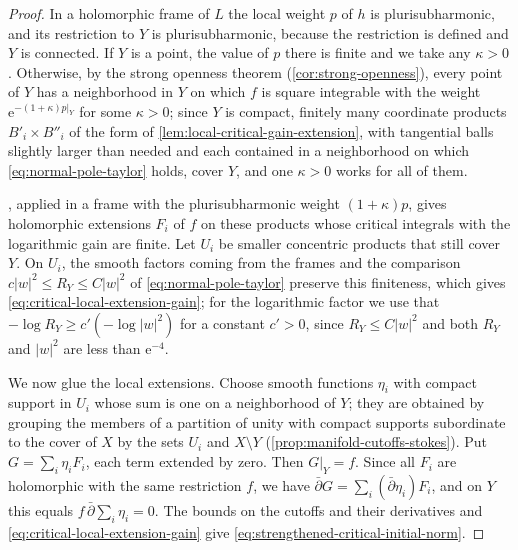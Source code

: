 \begin{proof}
In a holomorphic frame of $L$ the local weight $p$ of $h$ is plurisubharmonic, and its restriction to $Y$ is plurisubharmonic, because the restriction is defined and $Y$ is connected. If $Y$ is a point, the value of $p$ there is finite and we take any $\kappa>0$. Otherwise, by the strong openness theorem (\cref{cor:strong-openness}), every point of $Y$ has a neighborhood in $Y$ on which $f$ is square integrable with the weight $\mathrm e^{-(1+\kappa)p|_Y}$ for some $\kappa>0$; since $Y$ is compact, finitely many coordinate products $B'_i\times B''_i$ of the form of \cref{lem:local-critical-gain-extension}, with tangential balls slightly larger than needed and each contained in a neighborhood on which \eqref{eq:normal-pole-taylor} holds, cover $Y$, and one $\kappa>0$ works for all of them.

, applied in a frame with the plurisubharmonic weight $(1+\kappa)p$, gives holomorphic extensions $F_i$ of $f$ on these products whose critical integrals with the logarithmic gain are finite. Let $U_i$ be smaller concentric products that still cover $Y$. On $U_i$, the smooth factors coming from the frames and the comparison $c|w|^2\leq R_Y\leq C|w|^2$ of \eqref{eq:normal-pole-taylor} preserve this finiteness, which gives \eqref{eq:critical-local-extension-gain}; for the logarithmic factor we use that $-\log R_Y\geq c'(-\log|w|^2)$ for a constant $c'>0$, since $R_Y\leq C|w|^2$ and both $R_Y$ and $|w|^2$ are less than $\mathrm e^{-4}$.

We now glue the local extensions. Choose smooth functions $\eta_i$ with compact support in $U_i$ whose sum is one on a neighborhood of $Y$; they are obtained by grouping the members of a partition of unity with compact supports subordinate to the cover of $X$ by the sets $U_i$ and $X\setminus Y$ (\cref{prop:manifold-cutoffs-stokes}). Put $G=\sum_i\eta_iF_i$, each term extended by zero. Then $G|_Y=f$. Since all $F_i$ are holomorphic with the same restriction $f$, we have $\bar\partial G=\sum_i(\bar\partial\eta_i)F_i$, and on $Y$ this equals $f\,\bar\partial\sum_i\eta_i=0$. The bounds on the cutoffs and their derivatives and \eqref{eq:critical-local-extension-gain} give \eqref{eq:strengthened-critical-initial-norm}.


\end{proof}
